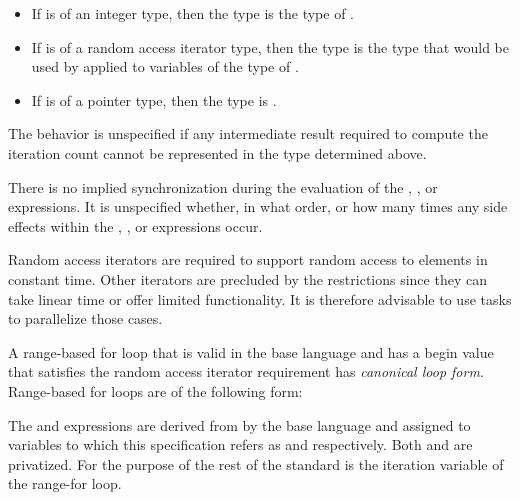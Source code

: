 \begin{itemize}
    \item If  is of an integer type, then the type is the type of .
\end{itemize}        
\begin{cppspecific}
\begin{itemize}
    \item If  is of a random access iterator type, then the type is the type that
    would be used by  applied to variables of the type of .
\end{itemize}
\end{cppspecific}
\begin{cspecific}
\begin{itemize}
    \item If  is of a pointer type, then the type is .
\end{itemize}
\end{cspecific}

The behavior is unspecified if any intermediate result required to compute the iteration
count cannot be represented in the type determined above.

There is no implied synchronization during the evaluation of the , , or 
expressions. It is unspecified whether, in what order, or how many times any side effects
within the , , or  expressions occur.

\begin{note}
Random access iterators are required to support random access to elements in
constant time. Other iterators are precluded by the restrictions since they can take linear
time or offer limited functionality. It is therefore advisable to use tasks to parallelize
those cases.


\end{note}

\begin{cppspecific}

A range-based for loop that is valid in the base language and has a begin value
that satisfies the random access iterator requirement has \emph{canonical loop
form}.  Range-based for loops are of the following form:

\scode{: }\scode{) }


The  and  expressions are derived from
 by the base language and assigned to variables to which this
specification refers as  and  respectively.  Both
 and  are privatized.  For the purpose of the rest of
the standard  is the iteration variable of the range-for loop.

\end{cppspecific}

